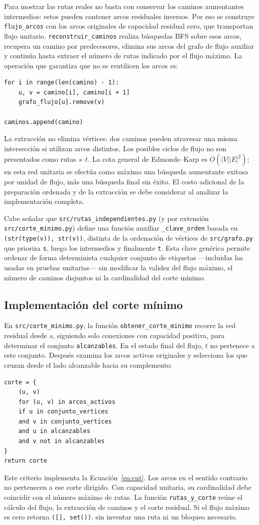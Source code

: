 \documentclass[11pt,a4paper]{article}
\begin{document}
Para mostrar las rutas reales no basta con conservar los caminos aumentantes intermedios: estos pueden contener arcos residuales inversos. Por eso se construye \texttt{flujo\_arcos} con los arcos originales de capacidad residual cero, que transportan flujo unitario. \texttt{reconstruir\_caminos} realiza búsquedas BFS sobre esos arcos, recupera un camino por predecesores, elimina sus arcos del grafo de flujo auxiliar y continúa hasta extraer el número de rutas indicado por el flujo máximo. La operación que garantiza que no se reutilicen los arcos es:
\begin{lstlisting}
for i in range(len(camino) - 1):
    u, v = camino[i], camino[i + 1]
    grafo_flujo[u].remove(v)

caminos.append(camino)
\end{lstlisting}
La extracción no elimina vértices: dos caminos pueden atravesar una misma intersección si utilizan arcos distintos. Los posibles ciclos de flujo no son presentados como rutas $s$--$t$. La cota general de Edmonds--Karp es $O(|V||E|^2)$; en esta red unitaria se efectúa como máximo una búsqueda aumentante exitosa por unidad de flujo, más una búsqueda final sin éxito. El costo adicional de la preparación ordenada y de la extracción se debe considerar al analizar la implementación completa.

Cabe señalar que \texttt{src/rutas\_independientes.py} (y por extensión \texttt{src/corte\_minimo.py}) define una función auxiliar \texttt{\_clave\_orden} basada en \texttt{(str(type(v)), str(v))}, distinta de la ordenación de vértices de \texttt{src/grafo.py} que prioriza \texttt{s}, luego los intermedios y finalmente \texttt{t}. Esta clave genérica permite ordenar de forma determinista cualquier conjunto de etiquetas ---incluidas las usadas en pruebas unitarias--- sin modificar la validez del flujo máximo, el número de caminos disjuntos ni la cardinalidad del corte mínimo.

\subsection{Implementación del corte mínimo}
En \texttt{src/corte\_minimo.py}, la función \texttt{obtener\_corte\_minimo} recorre la red residual desde $s$, siguiendo solo conexiones con capacidad positiva, para determinar el conjunto \texttt{alcanzables}. En el estado final del flujo, $t$ no pertenece a este conjunto. Después examina los arcos activos originales y selecciona los que cruzan desde el lado alcanzable hacia su complemento:
\begin{lstlisting}
corte = {
    (u, v)
    for (u, v) in arcos_activos
    if u in conjunto_vertices
    and v in conjunto_vertices
    and u in alcanzables
    and v not in alcanzables
}
return corte
\end{lstlisting}
Este criterio implementa la Ecuación~\ref{eq:cut}. Los arcos en el sentido contrario no pertenecen a ese corte dirigido. Con capacidad unitaria, su cardinalidad debe coincidir con el número máximo de rutas. La función \texttt{rutas\_y\_corte} reúne el cálculo del flujo, la extracción de caminos y el corte residual. Si el flujo máximo es cero retorna \texttt{([], set())}, sin inventar una ruta ni un bloqueo necesario.
\end{document}
